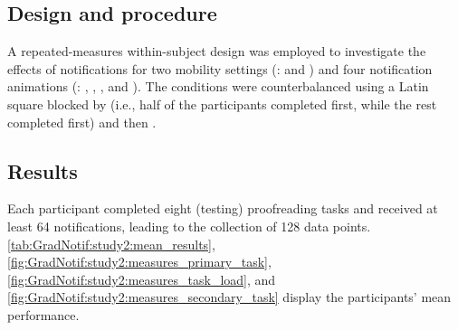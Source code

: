 \subsection{Design and procedure}
\label{sec:GradNotif:study2:design_procedure}

A repeated-measures within-subject design was employed to investigate the effects of notifications for two mobility settings (\mobility{}: \sitting{} and \walking{}) and four notification animations (\animation{}: \instant{}, \fastfade{}, \slowfade{}, and \scroll{}). The conditions were counterbalanced using a Latin square blocked by \mobility{} (i.e., half of the participants completed \sitting{} first, while the rest completed \walking{} first) and then \animation{}. 


\subsection{Results}

Each participant completed eight (testing) proofreading tasks and received at least 64 notifications, leading to the collection of 128 data points. \autoref{tab:GradNotif:study2:mean_results}, \autoref{fig:GradNotif:study2:measures_primary_task}, \autoref{fig:GradNotif:study2:measures_task_load}, and \autoref{fig:GradNotif:study2:measures_secondary_task} display the participants' mean performance. 


